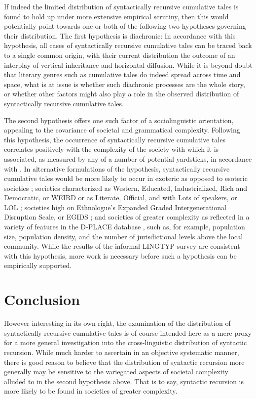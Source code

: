 \documentclass[output=paper]{langscibook}
\begin{document}
If indeed the limited distribution of syntactically recursive cumulative tales is found to hold up under more extensive empirical scrutiny, then this would potentially point towards one or both of the following two hypotheses governing their distribution.  The first hypothesis is diachronic:  In accordance with this hypothesis, all cases of syntactically recursive cumulative tales can be traced back to a single common origin, with their current distribution the outcome of an interplay of vertical inheritance and horizontal diffusion.  While it is beyond doubt that literary genres such as cumulative tales do indeed spread across time and space, what is at issue is whether such diachronic processes are the whole story, or whether other factors might also play a role in the observed distribution of syntactically recursive cumulative tales.  

The second hypothesis offers one such factor of a sociolinguistic orientation, appealing to the covariance of societal and grammatical complexity.  Following this hypothesis, the occurrence of syntactically recursive cumulative tales correlates positively with the complexity of the society with which it is associated, as measured by any of a number of potential yardsticks, in accordance with \citet{chen2023linguistic}.  In alternative formulations of the hypothesis, syntactically recursive cumulative tales would be more likely to occur in exoteric as opposed to esoteric societies \citep{thurston1987processes, wray2007consequences}; societies characterized as Western, Educated, Industrialized, Rich and Democratic, or WEIRD \citep{henrich2010weirdest, henrich2020weirdest}  or as Literate, Official, and with Lots of speakers, or LOL \citep{dahl2015weird}; societies high on Ethnologue's Expanded Graded Intergenerational Disruption Scale, or EGIDS \citep{eberhard2020ethnologue}; and societies of greater complexity as reflected in a variety of features in the D-PLACE database \citep{kirby2016dplace}, such as, for example, population size, population density, and the number of jurisdictional levels above the local community.  While the results of the informal LINGTYP survey are consistent with this hypothesis, more work is necessary before such a hypothesis can be empirically supported.

\section{Conclusion}

However interesting in its own right, the examination of the distribution of syntactically recursive cumulative tales is of course intended here as a mere proxy for a more general investigation into the cross-linguistic distribution of syntactic recursion.  While much harder to ascertain in an objective systematic manner, there is good reason to believe that the distribution of syntactic recursion more generally may be sensitive to the variegated aspects of societal complexity alluded to in the second hypothesis above.  That is to say, syntactic recursion is more likely to be found in societies of greater complexity. 
\end{document}
